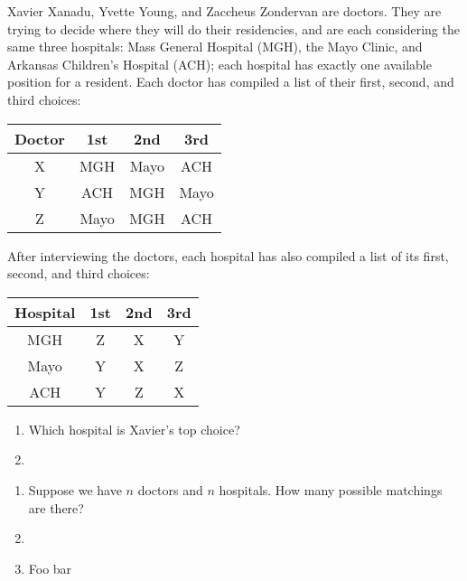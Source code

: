 
Xavier Xanadu, Yvette Young, and Zaccheus Zondervan are doctors.  They
are trying to decide where they will do their residencies, and are
each considering the same three hospitals: Mass General Hospital
(MGH), the Mayo Clinic, and Arkansas Children's Hospital (ACH); each
hospital has exactly one available position for a resident.  Each doctor
has compiled a list of their first, second, and third choices:

\begin{center}
\begin{tabular}{c|ccc}
  Doctor & 1st & 2nd & 3rd \\
  \hline
    X & MGH & Mayo & ACH \\
    Y & ACH & MGH & Mayo \\
    Z & Mayo & MGH & ACH
\end{tabular}
\end{center}

After interviewing the doctors, each hospital has also compiled a list
of its first, second, and third choices:

\begin{center}
  \begin{tabular}{c|ccc}
    Hospital & 1st & 2nd & 3rd \\
    \hline
    MGH & Z & X & Y \\
    Mayo & Y & X & Z \\
    ACH & Y & Z & X
  \end{tabular}
\end{center}

\begin{enumerate}
\item Which hospital is Xavier's top choice? \bigskip

\item 
\end{enumerate}


\begin{enumerate}[resume]
\item Suppose we have $n$ doctors and $n$ hospitals.  How many
  possible matchings are there?
\item {}
\item Foo bar
\end{enumerate}
